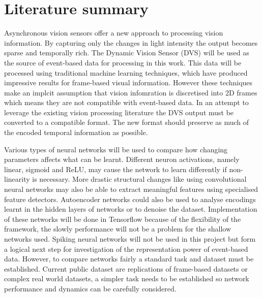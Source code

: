 \section{Literature summary}      %
Asynchronous vision sensors offer a new approach to processing vision information. 
By capturing only the changes in light intensity the output becomes sparse and temporally rich.
The Dynamic Vision Sensor (DVS) will be used as the source of event-based data for processing in this work.
This data will be processed using traditional machine learning techniques, which have produced impressive results for frame-based visual information. 
However these techniques make an implcit assumption that vision infomration is discretised into 2D frames which means they are not compatible with event-based data.
In an attempt to leverage the existing vision processing literature the DVS output must be converted to a compatible format. 
The new format should preserve as much of the encoded temporal information as possible.

Various types of neural networks will be used to compare how changing parameters affects what can be learnt.
Different neuron activations, namely linear, sigmoid and ReLU, may cause the network to learn differently if non-linearity is necessary. 
More drastic structural changes like using convolutional neural networks may also be able to extract meaningful features using specialised feature detectors. 
Autoencoder networks could also be used to analyse encodings learnt in the hidden layers of networks or to denoise the dataset.
Implementation of these networks will be done in Tensorflow because of the flexibility of the framework, the slowly performance will not be a problem for the shallow networks used.
Spiking neural networks will not be used in this project but form a logical next step for investigation of the representation power of event-based data. 
However, to compare networks fairly a standard task and dataset must be established.
Current public dataset are replications of frame-based datasets or complex real world datasets, a simpler task needs to be established so network performance and dynamics can be carefully considered. 



